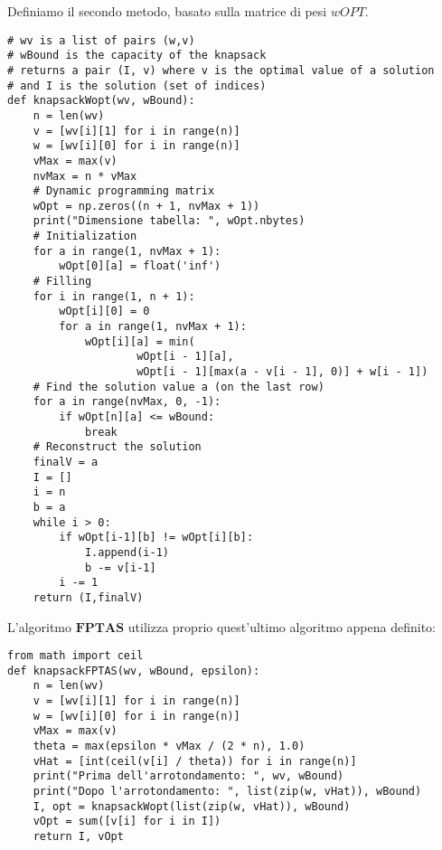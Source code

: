 Definiamo il secondo metodo, basato sulla matrice di pesi $wOPT$. 

\begin{verbatim}
# wv is a list of pairs (w,v)
# wBound is the capacity of the knapsack
# returns a pair (I, v) where v is the optimal value of a solution
# and I is the solution (set of indices)
def knapsackWopt(wv, wBound):
    n = len(wv)
    v = [wv[i][1] for i in range(n)]
    w = [wv[i][0] for i in range(n)]
    vMax = max(v)
    nvMax = n * vMax
    # Dynamic programming matrix
    wOpt = np.zeros((n + 1, nvMax + 1))
    print("Dimensione tabella: ", wOpt.nbytes)
    # Initialization
    for a in range(1, nvMax + 1):
        wOpt[0][a] = float('inf')
    # Filling
    for i in range(1, n + 1):
        wOpt[i][0] = 0
        for a in range(1, nvMax + 1):
            wOpt[i][a] = min(
                    wOpt[i - 1][a], 
                    wOpt[i - 1][max(a - v[i - 1], 0)] + w[i - 1])
    # Find the solution value a (on the last row)
    for a in range(nvMax, 0, -1):
        if wOpt[n][a] <= wBound:
            break
    # Reconstruct the solution
    finalV = a
    I = []
    i = n
    b = a
    while i > 0:
        if wOpt[i-1][b] != wOpt[i][b]:
            I.append(i-1)
            b -= v[i-1]
        i -= 1
    return (I,finalV)
\end{verbatim}


L'algoritmo $\mathbf{FPTAS}$ utilizza proprio quest'ultimo algoritmo appena definito: 

\begin{verbatim}
from math import ceil
def knapsackFPTAS(wv, wBound, epsilon):
    n = len(wv)
    v = [wv[i][1] for i in range(n)]
    w = [wv[i][0] for i in range(n)]
    vMax = max(v)
    theta = max(epsilon * vMax / (2 * n), 1.0)
    vHat = [int(ceil(v[i] / theta)) for i in range(n)]
    print("Prima dell'arrotondamento: ", wv, wBound)
    print("Dopo l'arrotondamento: ", list(zip(w, vHat)), wBound)
    I, opt = knapsackWopt(list(zip(w, vHat)), wBound)
    vOpt = sum([v[i] for i in I])
    return I, vOpt
\end{verbatim}



